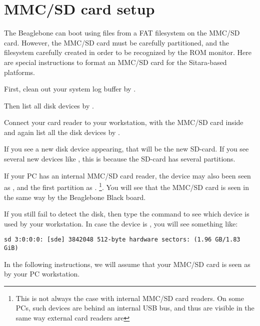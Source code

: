 
\section{MMC/SD card setup}

The Beaglebone can boot using files from a FAT filesystem on the MMC/SD
card. However, the MMC/SD card must be carefully partitioned, and the
filesystem carefully created in order to be recognized by the ROM
monitor. Here are special instructions to format an MMC/SD card
for the Sitara-based platforms.

First, clean out your system log buffer by .

Then list all disk devices by .

Connect your card reader to your workstation, with the MMC/SD
card inside and again list all the disk devices by .

If you see a new disk device appearing, that will be the new SD-card.
If you see several new devices like ,
this is because the SD-card has several partitions.

If your PC has an internal MMC/SD card reader, the device may also been
seen as , and the first partition as
. \footnote{This is not always the case with internal
MMC/SD card readers. On some PCs, such devices are behind an internal
USB bus, and thus are visible in the same way external card readers
are}. You will see that the MMC/SD card is seen in the same
way by the Beaglebone Black board.

If you still fail to detect the disk, then type the  command 
to see which device is used by your workstation. 
In case the device is , you will see something like:

\begin{verbatim}
sd 3:0:0:0: [sde] 3842048 512-byte hardware sectors: (1.96 GB/1.83 GiB)
\end{verbatim}


In the following instructions, we will assume that your MMC/SD card
is seen as  by your PC workstation.


